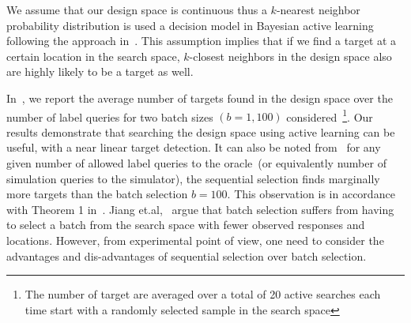 We assume that our design space is continuous thus a \(k\)-nearest neighbor probability distribution is used a decision model in Bayesian active learning following the approach in~\cite{jiang2018efficient}. This assumption implies that if we find a target at a certain location in the search space, \(k\)-closest neighbors in the design space also are highly likely to be a target as well. 



In~, we report the average number of targets found in the design space over the number of label queries for two batch sizes \((b=1,100)\) considered~\footnote{The number of target are averaged over a total of 20 active searches each time start with a randomly selected sample in the search space}.
Our results demonstrate that searching the design space using active learning can be useful, with a near linear target detection. It can also be noted from~ for any given number of allowed label queries to the oracle~(or equivalently number of simulation queries to the simulator), the sequential selection finds marginally more targets than the batch selection \(b=100\).
This observation is in accordance with Theorem 1 in~\cite{jiang2018efficient}. Jiang et.al,~\cite{jiang2018efficient} argue that batch selection suffers from having to select a batch from the search space with fewer observed responses and locations. However, from experimental point of view, one need to consider the advantages and dis-advantages of sequential selection over batch selection. 
